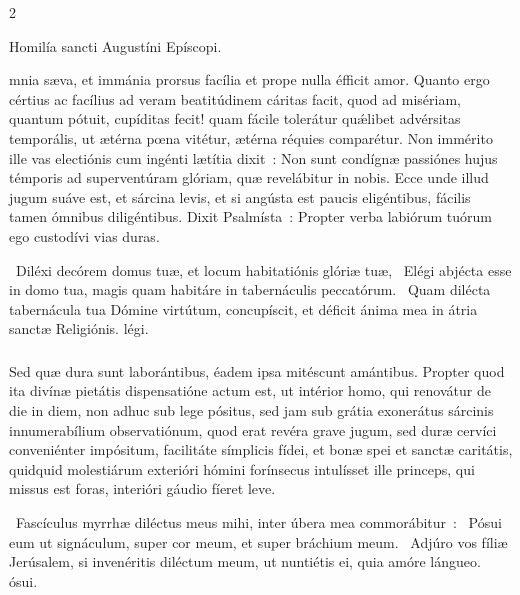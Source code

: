 \documentclass[9pt,twoside]{extarticle}
\begin{document}
\begin{multicols}{2}
{\begin{center}Homilía sancti Augustíni Epíscopi.\\
\end{center}
mnia sæva, et immánia prorsus facília et prope nulla éfficit amor. Quanto ergo cértius ac facílius ad veram beatitúdinem cáritas facit, quod ad misériam, quantum pótuit, cupíditas fecit! quam fácile tolerátur quǽlibet advérsitas temporális, ut ætérna pœna vitétur, ætérna réquies comparétur. Non immérito ille vas electiónis cum ingénti lætítia dixit~: Non sunt condígnæ passiónes hujus témporis ad superventúram glóriam, quæ revelábitur in nobis. Ecce unde illud jugum suáve est, et sárcina levis, et si angústa est paucis eligéntibus, fácilis tamen ómnibus diligéntibus. Dixit Psalmísta~: Propter verba labiórum tuórum ego custodívi vias duras.

\begin{tightlist}{}
\item {}~Diléxi decórem domus tuæ, et locum habitatiónis glóriæ tuæ, \textred{*}~Elégi abjécta esse in domo tua, magis quam habitáre in tabernáculis peccatórum. ~Quam dilécta tabernácula tua Dómine virtútum, concupíscit, et déficit ánima mea in átria sanctæ Religiónis. légi.
\end{tightlist}

\subsubsection*{\center {}}
Sed quæ dura sunt laborántibus, éadem ipsa mitéscunt amántibus. Propter quod ita divínæ pietátis dispensatióne actum est, ut intérior homo, qui renovátur de die in diem, non adhuc sub lege pósitus, sed jam sub grátia exonerátus sárcinis innumerabílium observatiónum, quod erat revéra grave jugum, sed duræ cervíci conveniénter impósitum, facilitáte símplicis fídei, et bonæ spei et sanctæ caritátis, quidquid molestiárum exterióri hómini forínsecus intulísset ille princeps, qui missus est foras, interióri gáudio fíeret leve.

\begin{tightlist}{}
\item {}~Fascículus myrrhæ diléctus meus mihi, inter úbera mea commorábitur~: \textred{*}~Pósui eum ut signáculum, super cor meum, et super bráchium meum. ~Adjúro vos fíliæ Jerúsalem, si invenéritis diléctum meum, ut nuntiétis ei, quia amóre lángueo. ósui.
\end{tightlist}

}
\end{multicols}
\end{document}
